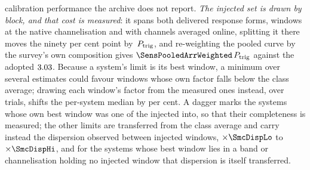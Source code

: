 calibration performance the archive does not report. \emph{The injected set is drawn by block, and that cost is measured}:
it spans both delivered response forms, \TfInjNat{} windows at the native
channelisation and \TfInjAvg{} with channels averaged online, splitting it
there moves the ninety per cent point by \TfFacShift\,$P_{\rm trig}$, and
re-weighting the pooled curve by the survey's own composition
gives $\SensPooledArrWeighted\,P_{\rm trig}$ against the adopted
$3.03$. Because a system's limit is its best window, a minimum
over several estimates could favour windows whose own factor falls below the
class average; drawing each window's factor from the \SensNInj{} measured
ones instead, over \ScRsNTrial{} trials, shifts the per-system median by
\ScRsMedShiftPct{} per cent. A dagger marks
the \SmcNMeasSys{} systems whose own best window was one of the \SensNInj{}
injected into, so that their completeness is measured; the other
\SmcNEstSys{} limits are transferred from the class average and carry instead
the dispersion observed between injected windows, $\times\SmcDispLo$ to
$\times\SmcDispHi$, and for the \NgNExtrapSys{} systems whose best window
lies in a band or channelisation holding no injected window that dispersion
is itself transferred.

\begin{table}
\centering
\caption{\textbf{Per-system sensitivity of the carrier search.} For each of
the \NSysClassA{} systems the fine-channel search covers, the
$\mathrm{EIRP}_{90}$ of its best window with its own primary-beam,
annual-parallax and smearing retentions applied. Rows are ordered by the
limit; a bound pair is one system under its primary's name; columns and
daggers are defined above.}
\label{tab:persys}
\footnotesize

\end{table}
